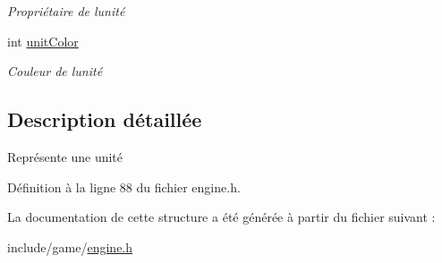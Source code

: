 \begin{DoxyCompactItemize}
\begin{DoxyCompactList}\small\item\em Propriétaire de l\textquotesingle{}unité \end{DoxyCompactList}\item 
\hypertarget{structunit_abc126ccf502f7c7e7ec72e38b75c3e0e}{}int \hyperlink{structunit_abc126ccf502f7c7e7ec72e38b75c3e0e}{unit\+Color}\label{structunit_abc126ccf502f7c7e7ec72e38b75c3e0e}

\begin{DoxyCompactList}\small\item\em Couleur de l\textquotesingle{}unité \end{DoxyCompactList}\end{DoxyCompactItemize}


\subsection{Description détaillée}
Représente une unité 

Définition à la ligne 88 du fichier engine.\+h.



La documentation de cette structure a été générée à partir du fichier suivant \+:\begin{DoxyCompactItemize}
\item 
include/game/\hyperlink{engine_8h}{engine.\+h}\end{DoxyCompactItemize}
